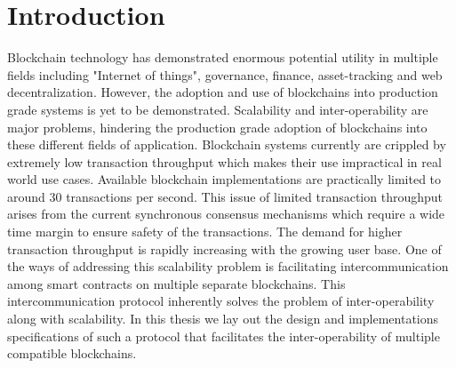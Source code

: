 \documentclass[a4paper,twoside,phd]{BYUPhys}
\begin{document}
 \frontmatter


 \makepreliminarypages


\doublespace
%

%

 \clearemptydoublepage
\singlespace
 \tableofcontents

\clearemptydoublepage
\listoffigures

\clearemptydoublepage
\listoftables

\clearemptydoublepage

\mainmatter
%
\chapter{Introduction}
\label{chap:Introduction}
Blockchain technology has demonstrated enormous potential utility in multiple fields including "Internet of things", governance, finance, asset-tracking and web decentralization. However, the adoption and use of blockchains into production grade systems is yet to be demonstrated. 
 Scalability and inter-operability are major problems, hindering the production grade adoption of blockchains into these different fields of application. Blockchain systems currently are crippled by extremely low transaction  throughput which makes their use impractical in real world use cases. Available blockchain implementations are practically limited to around 30 transactions per second. This issue of limited transaction throughput arises from the current synchronous consensus mechanisms which require a wide time margin to ensure safety of the transactions. The demand for higher transaction throughput is rapidly increasing with the growing user base. One of the  ways of addressing this scalability problem is facilitating intercommunication among smart contracts on multiple separate blockchains. This intercommunication protocol inherently solves the problem of inter-operability along with scalability. In this thesis we lay out the design and implementations specifications of such a protocol that facilitates the inter-operability of multiple compatible blockchains.
\end{document}
